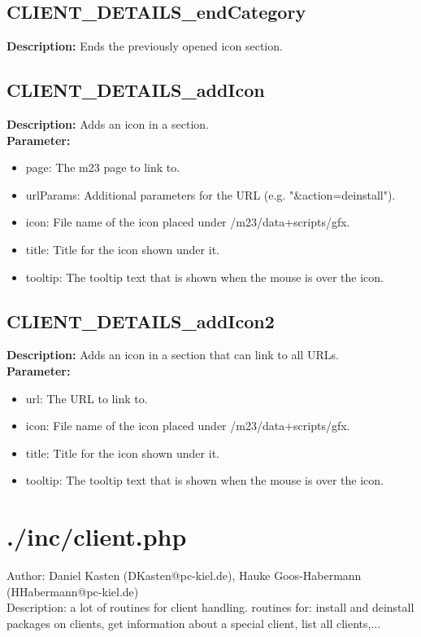 \subsection{CLIENT\_DETAILS\_endCategory}
\textbf{Description:} Ends the previously opened icon section.\\

\subsection{CLIENT\_DETAILS\_addIcon}
\textbf{Description:} Adds an icon in a section.\\
\textbf{Parameter:}
\begin{itemize}
\item page: The m23 page to link to.
\item urlParams: Additional parameters for the URL (e.g. "\&action=deinstall").
\item icon: File name of the icon placed under /m23/data+scripts/gfx.
\item title: Title for the icon shown under it.
\item tooltip: The tooltip text that is shown when the mouse is over the icon.
\end{itemize}

\subsection{CLIENT\_DETAILS\_addIcon2}
\textbf{Description:} Adds an icon in a section that can link to all URLs.\\
\textbf{Parameter:}
\begin{itemize}
\item url: The URL to link to.
\item icon: File name of the icon placed under /m23/data+scripts/gfx.
\item title: Title for the icon shown under it.
\item tooltip: The tooltip text that is shown when the mouse is over the icon.
\end{itemize}

\newpage\section{./inc/client.php}
 Author: Daniel Kasten (DKasten@pc-kiel.de), Hauke Goos-Habermann (HHabermann@pc-kiel.de)\\
 Description: a lot of routines for client handling. routines for: install and deinstall packages on clients, get information about a special client, list all clients,...\\

